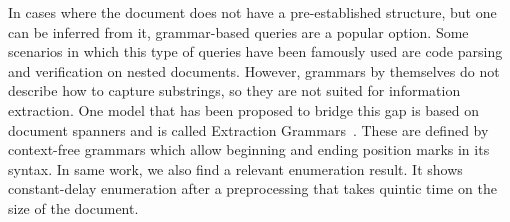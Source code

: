 % 
% 
 In cases where the document does not have a pre-established structure, but one can be inferred from it, grammar-based queries are a popular option. Some scenarios in which this type of queries have been famously used are code parsing and verification on nested documents. However, grammars by themselves do not describe how to capture substrings, so they are not suited for information extraction. One model that has been proposed to bridge this gap is based on document spanners and is called Extraction Grammars~\cite{Peterfreund21}. These are defined by context-free grammars which allow beginning and ending position marks in its syntax. 
 In same work, we also find a relevant enumeration result. It shows constant-delay enumeration after a preprocessing that takes quintic time on the size of the document.
 



